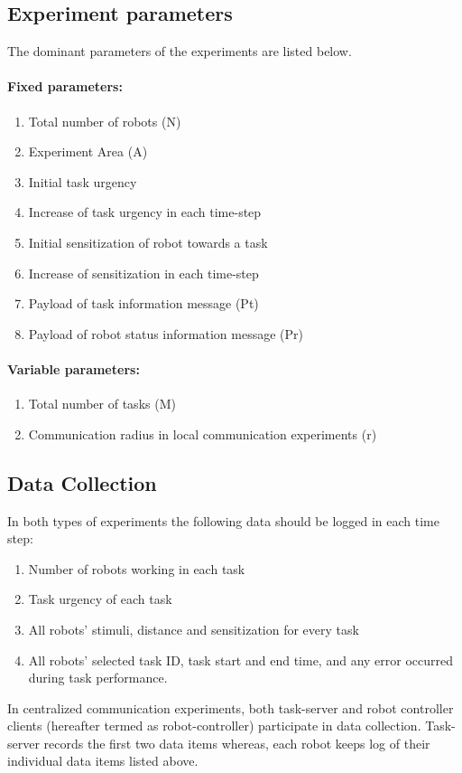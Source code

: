 \documentclass{article}
\begin{document}
\subsection{Experiment parameters}
The dominant parameters of the experiments are listed below.
\paragraph{Fixed parameters:}
\begin{enumerate}
\item Total number of robots (N)
\item Experiment Area (A)
\item Initial task urgency
\item Increase of task urgency in each time-step
\item Initial sensitization of robot towards a task
\item Increase of sensitization in each time-step
\item Payload of task information message (Pt)
\item Payload of robot status information message (Pr)
\end{enumerate}
\paragraph{Variable parameters:}
\begin{enumerate}
\item Total number of tasks (M)
\item Communication radius in local communication experiments (r)
\end{enumerate}
%
\subsection{Data Collection}
In both types of experiments the following data should be logged in each time step:
\begin{enumerate}
\item Number of robots working in each task
\item Task urgency of each task 
\item All robots' stimuli, distance and sensitization for every task
\item All robots'  selected task ID, task start and end time, and any error occurred during task performance.
\end{enumerate}

In centralized communication experiments, both task-server and robot controller clients (hereafter termed as robot-controller) participate in data collection.  Task-server records the first two data items whereas, each robot keeps log of their individual  data items listed above.
 
\end{document}
